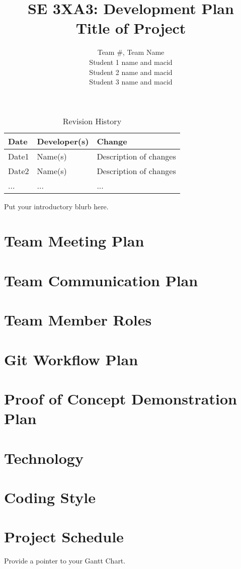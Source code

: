 \documentclass{article}
\title{SE 3XA3: Development Plan\\Title of Project}
\author{Team \#, Team Name
		\\ Student 1 name and macid
		\\ Student 2 name and macid
		\\ Student 3 name and macid
}
\date{}
\begin{document}
\begin{table}[hp]
\caption{Revision History} \label{TblRevisionHistory}
\begin{tabularx}{\textwidth}{llX}
\toprule
\textbf{Date} & \textbf{Developer(s)} & \textbf{Change}\\
\midrule
Date1 & Name(s) & Description of changes\\
Date2 & Name(s) & Description of changes\\
... & ... & ...\\
\bottomrule
\end{tabularx}
\end{table}

\newpage

\maketitle

Put your introductory blurb here.

\section{Team Meeting Plan}

\section{Team Communication Plan}

\section{Team Member Roles}

\section{Git Workflow Plan}

\section{Proof of Concept Demonstration Plan}

\section{Technology}

\section{Coding Style}

\section{Project Schedule}

Provide a pointer to your Gantt Chart.
\end{document}
